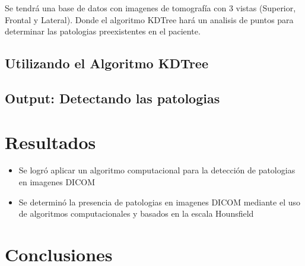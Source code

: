\documentclass{article}
\begin{document}
Se tendrá una base de datos con imagenes de tomografía con 3 vistas (Superior, Frontal y Lateral). Donde el algoritmo KDTree hará un analisis de puntos para determinar las patologias preexistentes en el paciente.

\subsection{Utilizando el Algoritmo KDTree}
\subsection{Output: Detectando las patologias}




	\section{Resultados}
	\begin{itemize}
		\item Se logró aplicar  un algoritmo computacional para la detección de patologias en imagenes DICOM
		\item Se determinó la presencia de patologias en imagenes DICOM mediante el uso de algoritmos computacionales y basados en la escala Hounsfield
		\end{itemize}
		


	\section{Conclusiones}


	
	
\end{document}
